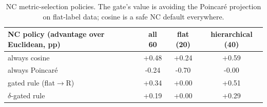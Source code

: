 \begin{table}[H]
\centering
\small
\begin{tabular}{lccc}
\toprule
NC policy (advantage over Euclidean, pp) & all 60 & flat (20) & hierarchical (40) \\
\midrule
always cosine & +0.48 & +0.24 & +0.59 \\
always Poincar\'e & -0.24 & -0.70 & -0.00 \\
gated rule (flat$\to$R) & +0.34 & +0.00 & +0.51 \\
$\delta$-gated rule & +0.19 & +0.00 & +0.29 \\
\bottomrule
\end{tabular}
\caption{NC metric-selection policies. The gate's value is avoiding the Poincar\'e projection on flat-label data; cosine is a safe NC default everywhere.}
\label{tab:b9-ncpolicies}
\end{table}
